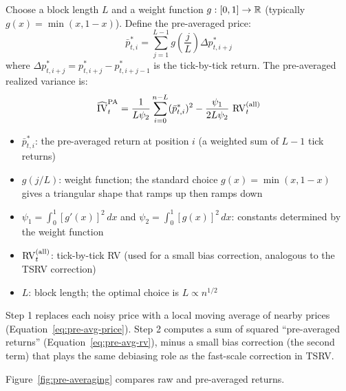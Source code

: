 \begin{definition}
Choose a block length $L$ and a weight function $g:[0,1] \to \mathbb{R}$ (typically $g(x) = \min(x, 1-x)$).
Define the pre-averaged price:
\begin{equation}
  \bar{p}^*_{t,i} = \sum_{j=1}^{L-1} g\!\left(\frac{j}{L}\right) \Delta p^*_{t,i+j}
  \label{eq:pre-avg-price}
\end{equation}
where $\Delta p^*_{t,i+j} = p^*_{t,i+j} - p^*_{t,i+j-1}$ is the tick-by-tick return.
The pre-averaged realized variance is:
\begin{equation}
  \widehat{\operatorname{IV}}_t^{\text{PA}} = \frac{1}{L \psi_2} \sum_{i=0}^{n - L} (\bar{p}^*_{t,i})^2 - \frac{\psi_1}{2 L \psi_2}\, \operatorname{RV}^{(\text{all})}_t
  \label{eq:pre-avg-rv}
\end{equation}
\begin{itemize}[nosep]
  \item $\bar{p}^*_{t,i}$: the pre-averaged return at position $i$ (a weighted sum of $L-1$ tick returns)
  \item $g(j/L)$: weight function; the standard choice $g(x) = \min(x, 1-x)$ gives a triangular shape that ramps up then ramps down
  \item $\psi_1 = \int_0^1 [g'(x)]^2\,dx$ and $\psi_2 = \int_0^1 [g(x)]^2\,dx$: constants determined by the weight function
  \item $\operatorname{RV}^{(\text{all})}_t$: tick-by-tick RV (used for a small bias correction, analogous to the TSRV correction)
  \item $L$: block length; the optimal choice is $L \propto n^{1/2}$
\end{itemize}
\end{definition}

\begin{intuition}
Step 1 replaces each noisy price with a local moving average of nearby prices (Equation~\ref{eq:pre-avg-price}).
Step 2 computes a sum of squared ``pre-averaged returns'' (Equation~\ref{eq:pre-avg-rv}), minus a small bias correction (the second term) that plays the same debiasing role as the fast-scale correction in TSRV.
\end{intuition}

Figure~\ref{fig:pre-averaging} compares raw and pre-averaged returns.

